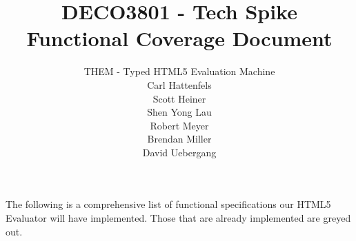 \documentclass[12pt]{article}
\title{DECO3801 - Tech Spike \\ Functional Coverage Document}
\author{THEM - Typed HTML5 Evaluation Machine \\ Carl Hattenfels \\ Scott Heiner \\ Shen Yong Lau \\ Robert Meyer \\ Brendan Miller \\ David Uebergang}
\date{}
\begin{document}
The following is a comprehensive list of functional specifications our HTML5 Evaluator will have implemented. Those that are already implemented are greyed out.
\end{document}
